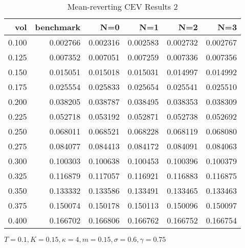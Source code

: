 \begin{table}[ht]
\centering
\caption{Mean-reverting CEV Results 2}
\begin{tabular}{rrrrrr}
\toprule
  vol &       benchmark &       N=0 &       N=1 &       N=2 &       N=3 \\
\midrule
0.100 & 0.002766 & 0.002316 & 0.002583 & 0.002732 & 0.002767 \\
0.125 & 0.007352 & 0.007051 & 0.007259 & 0.007336 & 0.007356 \\
0.150 & 0.015051 & 0.015018 & 0.015031 & 0.014997 & 0.014992 \\
0.175 & 0.025554 & 0.025833 & 0.025654 & 0.025541 & 0.025510 \\
0.200 & 0.038205 & 0.038787 & 0.038495 & 0.038353 & 0.038309 \\
0.225 & 0.052718 & 0.053192 & 0.052871 & 0.052738 & 0.052692 \\
0.250 & 0.068011 & 0.068521 & 0.068228 & 0.068119 & 0.068080 \\
0.275 & 0.084077 & 0.084413 & 0.084172 & 0.084091 & 0.084063 \\
0.300 & 0.100303 & 0.100638 & 0.100453 & 0.100396 & 0.100379 \\
0.325 & 0.116879 & 0.117057 & 0.116921 & 0.116883 & 0.116875 \\
0.350 & 0.133332 & 0.133586 & 0.133491 & 0.133465 & 0.133463 \\
0.375 & 0.150074 & 0.150178 & 0.150113 & 0.150096 & 0.150097 \\
0.400 & 0.166702 & 0.166806 & 0.166762 & 0.166752 & 0.166754 \\
\bottomrule
\end{tabular}
\small{$T=0.1,K=0.15, \kappa =4,m=0.15, \sigma = 0.6, \gamma = 0.75$}
\end{table}

